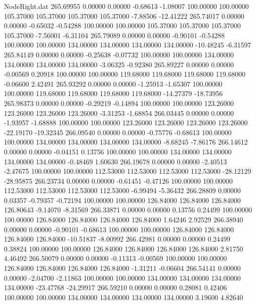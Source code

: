 \begin{filecontents}{NodeRight.dat}
 265.69955    0.00000    0.00000    -0.68613   -1.08007  100.00000  100.00000  105.37000  105.37000  105.37000  105.37000   -7.88506  -12.41222
 265.74017    0.00000    0.00000    -0.65032   -0.54288  100.00000  100.00000  105.37000  105.37000  105.37000  105.37000   -7.56001   -6.31104
 265.79089    0.00000    0.00000    -0.90101   -0.54288  100.00000  100.00000  134.00000  134.00000  134.00000  134.00000  -10.48245   -6.31597
 265.84149    0.00000    0.00000    -0.25638   -0.07732  100.00000  100.00000  134.00000  134.00000  134.00000  134.00000   -3.06325   -0.92380
 265.89227    0.00000    0.00000    -0.00569    0.20918  100.00000  100.00000  119.68000  119.68000  119.68000  119.68000   -0.06600    2.42491
 265.93292    0.00000    0.00000    -1.25913   -1.65307  100.00000  100.00000  119.68000  119.68000  119.68000  119.68000  -14.27379  -18.73956
 265.98373    0.00000    0.00000    -0.29219   -0.14894  100.00000  100.00000  123.26000  123.26000  123.26000  123.26000   -3.31253   -1.68854
 266.03445    0.00000    0.00000    -1.93957   -1.68888  100.00000  100.00000  123.26000  123.26000  123.26000  123.26000  -22.19170  -19.32345
 266.09540    0.00000    0.00000    -0.75776   -0.68613  100.00000  100.00000  134.00000  134.00000  134.00000  134.00000   -8.68245   -7.86176
 266.14612    0.00000    0.00000    -0.04151    0.13756  100.00000  100.00000  134.00000  134.00000  134.00000  134.00000   -0.48469    1.60630
 266.19678    0.00000    0.00000    -2.40513   -2.47675  100.00000  100.00000  112.53000  112.53000  112.53000  112.53000  -28.12129  -28.95875
 266.23734    0.00000    0.00000    -0.61451   -0.47126  100.00000  100.00000  112.53000  112.53000  112.53000  112.53000   -6.99494   -5.36432
 266.28809    0.00000    0.03357    -0.79357   -0.72194  100.00000  100.00000  126.84000  126.84000  126.84000  126.80643   -9.14070   -8.31569
 266.33871    0.00000    0.00000     0.13756    0.24499  100.00000  100.00000  126.84000  126.84000  126.84000  126.84000    1.64246    2.92529
 266.38940    0.00000    0.00000    -0.90101   -0.68613  100.00000  100.00000  126.84000  126.84000  126.84000  126.84000  -10.51837   -8.00992
 266.42981    0.00000    0.00000     0.24499    0.38824  100.00000  100.00000  126.84000  126.84000  126.84000  126.84000    2.81750    4.46492
 266.50079    0.00000    0.00000    -0.11313   -0.00569  100.00000  100.00000  126.84000  126.84000  126.84000  126.84000   -1.31211   -0.06604
 266.54141    0.00000    0.00000    -2.04700   -2.11863  100.00000  100.00000  134.00000  134.00000  134.00000  134.00000  -23.47768  -24.29917
 266.59210    0.00000    0.00000     0.28081    0.42406  100.00000  100.00000  134.00000  134.00000  134.00000  134.00000    3.19600    4.82640

\end{filecontents}
